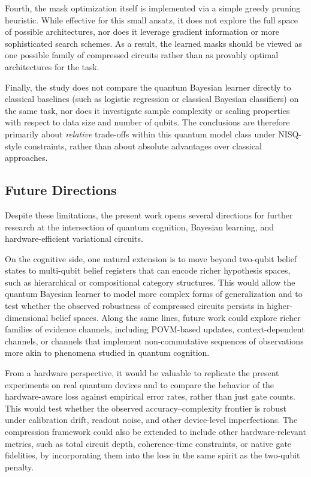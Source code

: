 \documentclass[conference]{IEEEtran}
\begin{document}
Fourth, the mask optimization itself is implemented via a simple greedy pruning
heuristic. While effective for this small ansatz, it does not explore the full
space of possible architectures, nor does it leverage gradient information or
more sophisticated search schemes. As a result, the learned masks should be
viewed as one possible family of compressed circuits rather than as
provably optimal architectures for the task.

Finally, the study does not compare the quantum Bayesian learner directly to
classical baselines (such as logistic regression or classical Bayesian
classifiers) on the same task, nor does it investigate sample complexity or
scaling properties with respect to data size and number of qubits. The
conclusions are therefore primarily about \emph{relative} trade-offs within
this quantum model class under NISQ-style constraints, rather than about
absolute advantages over classical approaches.

\subsection{Future Directions}

Despite these limitations, the present work opens several directions for
further research at the intersection of quantum cognition, Bayesian learning,
and hardware-efficient variational circuits.

On the cognitive side, one natural extension is to move beyond two-qubit
belief states to multi-qubit belief registers that can encode richer
hypothesis spaces, such as hierarchical or compositional category structures.
This would allow the quantum Bayesian learner to model more complex forms of
generalization and to test whether the observed robustness of compressed
circuits persists in higher-dimensional belief spaces. Along the same lines,
future work could explore richer families of evidence channels, including
POVM-based updates, context-dependent channels, or channels that implement
non-commutative sequences of observations more akin to phenomena studied in
quantum cognition.

From a hardware perspective, it would be valuable to replicate the present
experiments on real quantum devices and to compare the behavior of the
hardware-aware loss against empirical error rates, rather than just gate
counts. This would test whether the observed accuracy--complexity frontier is
robust under calibration drift, readout noise, and other device-level
imperfections. The compression framework could also be extended to include
other hardware-relevant metrics, such as total circuit depth, coherence-time
constraints, or native gate fidelities, by incorporating them into the loss in
the same spirit as the two-qubit penalty.
\end{document}
